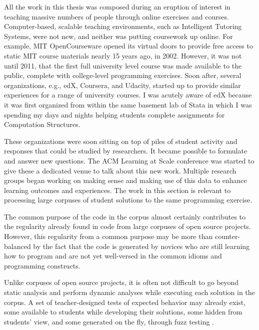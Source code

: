 All the work in this thesis was composed during an eruption of interest in teaching massive numbers of people through online exercises and courses. Computer-based, scalable teaching environments, such as Intelligent Tutoring Systems, were not new, and neither was putting coursework up online. For example, MIT OpenCourseware opened its virtual doors to provide free access to static MIT course materials nearly 15 years ago, in 2002. However, it was not until 2011, that the first full university level course was made available to the public, complete with college-level programming exercises. Soon after, several organizations, e.g., edX, Coursera, and Udacity, started up to provide similar experiences for a range of university courses. I was acutely aware of edX because it was first organized from within the same basement lab of Stata in which I was spending my days and nights helping students complete assignments for Computation Structures.


These organizations were soon sitting on top of piles of student activity and responses that could be studied by researchers. It became possible to formulate and answer new questions. The ACM Learning at Scale conference was started to give these a dedicated venue to talk about this new work. Multiple research groups began working on making sense and making use of this data to enhance learning outcomes and experiences. The work in this section is relevant to processing large corpuses of student solutions to the same programming exercise. %

The common purpose of the code in the corpus almost certainly contributes to the regularity already found in code from large corpuses of open source projects. However, this regularity from a common purpose may be more than counter-balanced by the fact that the code is generated by novices who are still learning how to program and are not yet well-versed in the common idioms and programming constructs. 

Unlike corpuses of open source projects, it is often not difficult to go beyond static analysis and perform dynamic analyses while executing each solution in the corpus. A set of teacher-designed tests of expected behavior may already exist, some available to students while developing their solutions, some hidden from students' view, and some generated on the fly, through fuzz testing \cite{fuzztesting}. %

